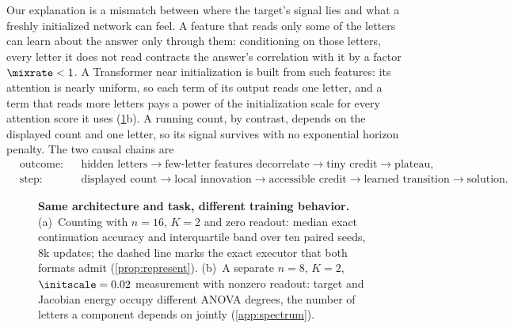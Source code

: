Our explanation is a mismatch between where the target's signal lies and what a freshly initialized network can feel.
A feature that reads only some of the letters can learn about the answer only through them: conditioning on those letters,
every letter it does not read contracts the answer's correlation with it by a factor $\mixrate<1$. A Transformer near
initialization is built from such features: its attention is nearly uniform, so each term of its output reads one letter,
and a term that reads more letters pays a power of the initialization scale for every attention score it uses
(\cref{fig:overview}b). A running count, by contrast, depends on the displayed count and one letter, so its signal survives
with no exponential horizon penalty. The two causal chains are
\[
\begin{aligned}
 &\text{outcome:}&&\text{hidden letters}\to\text{few-letter features decorrelate}\to\text{tiny credit}\to\text{plateau},\\
 &\text{step:}&&\text{displayed count}\to\text{local innovation}\to\text{accessible credit}\to\text{learned transition}\to\text{solution}.
\end{aligned}
\]

\begin{figure}[t]
\centering

\caption{\textbf{Same architecture and task, different training behavior.}
(a)~Counting with $n=16$, $K=2$ and zero readout: median exact continuation accuracy and interquartile band over ten paired seeds, $8$k
updates; the dashed line marks the exact executor that both formats admit (\cref{prop:represent}).
(b)~A separate $n=8$, $K=2$, $\initscale=0.02$ measurement with nonzero readout: target and Jacobian energy occupy different ANOVA degrees, the number of letters a component depends on jointly (\cref{app:spectrum}).}
\label{fig:overview}
\end{figure}

